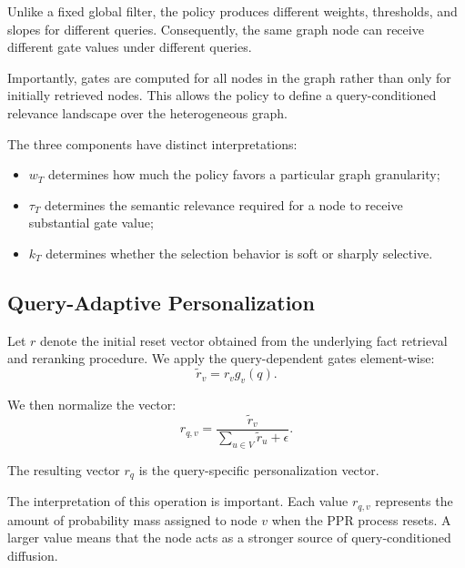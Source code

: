 \documentclass[conference]{IEEEtran}
\newcommand{\q}{q}
\newcommand{\reset}{r}
\begin{document}
Unlike a fixed global filter, the policy produces different weights,
thresholds, and slopes for different queries. Consequently, the same
graph node can receive different gate values under different queries.

Importantly, gates are computed for all nodes in the graph rather than
only for initially retrieved nodes. This allows the policy to define a
query-conditioned relevance landscape over the heterogeneous graph.

The three components have distinct interpretations:

\begin{itemize}
    \item $w_T$ determines how much the policy favors a particular
    graph granularity;
    \item $\tau_T$ determines the semantic relevance required for a
    node to receive substantial gate value;
    \item $k_T$ determines whether the selection behavior is soft or
    sharply selective.
\end{itemize}


\subsection{Query-Adaptive Personalization}

Let $\reset$ denote the initial reset vector obtained from the
underlying fact retrieval and reranking procedure. We apply the
query-dependent gates element-wise:
\begin{equation}
\tilde r_v
=
r_v g_v(\q).
\label{eq:rawpersonalization}
\end{equation}

We then normalize the vector:
\begin{equation}
r_{\q,v}
=
\frac{\tilde r_v}
{\sum_{u\in V}\tilde r_u+\epsilon}.
\label{eq:normalization}
\end{equation}

The resulting vector $\reset_{\q}$ is the query-specific
personalization vector.

The interpretation of this operation is important. Each value
$r_{\q,v}$ represents the amount of probability mass assigned to node
$v$ when the PPR process resets. A larger value means that the node
acts as a stronger source of query-conditioned diffusion.
\end{document}
